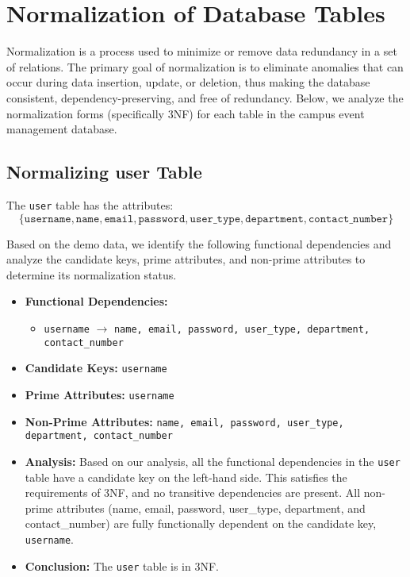 \section{Normalization of Database Tables}

Normalization is a process used to minimize or remove data redundancy in a set of relations. The primary goal of normalization is to eliminate anomalies that can occur during data insertion, update, or deletion, thus making the database consistent, dependency-preserving, and free of redundancy. Below, we analyze the normalization forms (specifically 3NF) for each table in the campus event management database.

\subsection{Normalizing user Table}

The \texttt{user} table has the attributes:
\[
\{ \texttt{username}, \texttt{name}, \texttt{email}, \texttt{password}, \texttt{user\_type}, \texttt{department}, \texttt{contact\_number} \}
\]

Based on the demo data, we identify the following functional dependencies and analyze the candidate keys, prime attributes, and non-prime attributes to determine its normalization status.

\begin{itemize}
    \item \textbf{Functional Dependencies:}
    \begin{itemize}
        \item \texttt{username} $\rightarrow$ \texttt{name, email, password, user\_type, department, contact\_number}
    \end{itemize}

    \item \textbf{Candidate Keys:} \texttt{username}
    
    \item \textbf{Prime Attributes:} \texttt{username}

    \item \textbf{Non-Prime Attributes:} \texttt{name, email, password, user\_type, department, contact\_number}

    \item \textbf{Analysis:} Based on our analysis, all the functional dependencies in the \texttt{user} table have a candidate key on the left-hand side. This satisfies the requirements of 3NF, and no transitive dependencies are present. All non-prime attributes (name, email, password, user\_type, department, and contact\_number) are fully functionally dependent on the candidate key, \texttt{username}.

    \item \textbf{Conclusion:} The \texttt{user} table is in 3NF.
\end{itemize}

